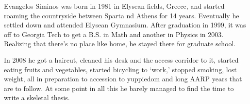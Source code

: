 \renewcommand{\inputfile}{\version\ - edited 2008-06-26 vita}

Evangelos Siminos was born in 1981 in Elysean fields, Greece, and
started roaming the countryside between Sparta nd Athens for 14 years.
Eventually he settled down and attended Elysean Gymnasium.
After graduation in 1999, it was off to Georgia Tech to get a B.S. in Math
and another in Physics in 2003.
Realizing that there's no place like home, he stayed there for graduate school.

In 2008 he got a haircut,
cleaned his desk and the access corridor to it, started eating fruits and vegetables,
started bicycling to `work,' stopped smoking, lost weight,
all in preparation to accession to yuppiedom and long AARP years that are to follow.
At some point in all this he barely managed to find the time to write a
skeletal thesis.
